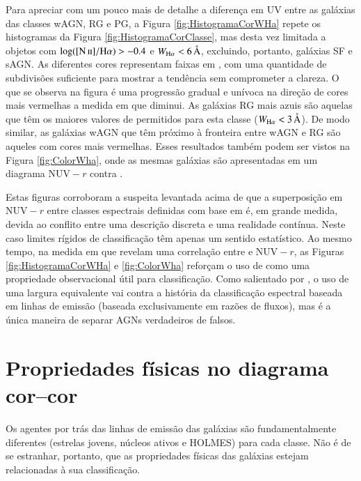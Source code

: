 Para apreciar com um pouco mais de detalhe a diferença em UV entre as galáxias
das classes wAGN, RG e PG, a Figura \ref{fig:HistogramaCorWHa} repete os
histogramas da Figura \ref{fig:HistogramaCorClasse}, mas desta vez limitada a
objetos com $\log(\nII/\Halpha) > -0.4$ e $\WHa < 6\,\text{\AA}$, excluindo,
portanto, galáxias SF e sAGN. As diferentes cores representam faixas em \WHa,
com uma quantidade de subdivisões suficiente para mostrar a tendência sem
comprometer a clareza. O que se observa na figura é uma progressão gradual e
unívoca na direção de cores mais vermelhas a medida em que \WHa diminui. As
galáxias RG mais azuis são aquelas que têm os maiores valores de \WHa permitidos
para esta classe ($\WHa < 3\,\text{\AA}$). De modo similar, as galáxias wAGN que
têm \WHa próximo à fronteira entre wAGN e RG são aqueles com cores mais
vermelhas. Esses resultados também podem ser vistos na Figura
\ref{fig:ColorWha}, onde as mesmas galáxias são apresentadas em um diagrama
$\mathrm{NUV}-r$ contra \WHa.

Estas figuras corroboram a suspeita levantada acima de que a superposição em
$\mathrm{NUV}-r$ entre classes espectrais definidas com base em \WHa é, em
grande medida, devida ao conflito entre uma descrição discreta e uma realidade
contínua. Neste caso limites rígidos de classificação têm apenas um sentido
estatístico. Ao mesmo tempo, na medida em que revelam uma correlação entre \WHa
e $\mathrm{NUV}-r$, as Figuras \ref{fig:HistogramaCorWHa} e \ref{fig:ColorWha}
reforçam o uso de \WHa como uma propriedade observacional útil para
classificação. Como salientado por \citet{CidFernandes2011}, o uso de uma
largura equivalente vai contra a história da classificação espectral baseada em
linhas de emissão (baseada exclusivamente em razões de fluxos), mas é a única
maneira de separar AGNs verdadeiros de falsos.



\section{Propriedades físicas no diagrama cor--cor}
\label{sec:Analise:PropFisicas}

Os agentes por trás das linhas de emissão das galáxias são fundamentalmente
diferentes (estrelas jovens, núcleos ativos e HOLMES) para cada classe. Não é de
se estranhar, portanto, que as propriedades físicas das galáxias estejam
relacionadas à sua classificação.

